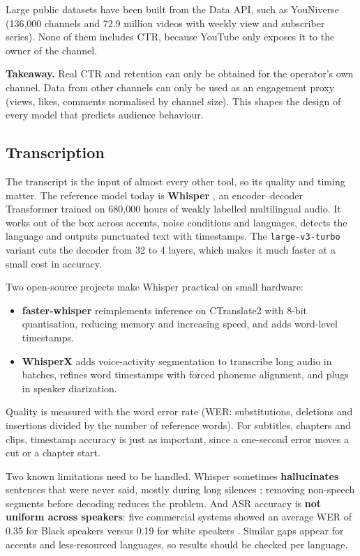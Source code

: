 \documentclass[ENG]{TFUOC}
\begin{document}
Large public datasets have been built from the Data API, such as YouNiverse \cite{ribeiro2021youniverse} (136{,}000 channels and 72.9 million videos with weekly view and subscriber series). None of them includes CTR, because YouTube only exposes it to the owner of the channel.

\textbf{Takeaway.} Real CTR and retention can only be obtained for the operator's own channel. Data from other channels can only be used as an engagement proxy (views, likes, comments normalised by channel size). This shapes the design of every model that predicts audience behaviour.

\subsection{Transcription}
\label{ss:soa-asr}

The transcript is the input of almost every other tool, so its quality and timing matter. The reference model today is \textbf{Whisper} \cite{radford2023whisper}, an encoder--decoder Transformer trained on 680{,}000 hours of weakly labelled multilingual audio. It works out of the box across accents, noise conditions and languages, detects the language and outputs punctuated text with timestamps. The \texttt{large-v3-turbo} variant cuts the decoder from 32 to 4 layers, which makes it much faster at a small cost in accuracy.

Two open-source projects make Whisper practical on small hardware:
\begin{itemize}
\item \textbf{faster-whisper} \cite{fasterwhisper} reimplements inference on CTranslate2 with 8-bit quantisation, reducing memory and increasing speed, and adds word-level timestamps.
\item \textbf{WhisperX} \cite{bain2023whisperx} adds voice-activity segmentation to transcribe long audio in batches, refines word timestamps with forced phoneme alignment, and plugs in speaker diarization.
\end{itemize}

Quality is measured with the word error rate (WER: substitutions, deletions and insertions divided by the number of reference words). For subtitles, chapters and clips, timestamp accuracy is just as important, since a one-second error moves a cut or a chapter start.

Two known limitations need to be handled. Whisper sometimes \textbf{hallucinates} sentences that were never said, mostly during long silences \cite{koenecke2024careless}; removing non-speech segments before decoding reduces the problem. And ASR accuracy is \textbf{not uniform across speakers}: five commercial systems showed an average WER of 0.35 for Black speakers versus 0.19 for white speakers \cite{koenecke2020racial}. Similar gaps appear for accents and less-resourced languages, so results should be checked per language.
\end{document}

